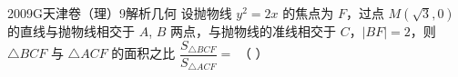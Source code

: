 
\begin{problem}{2009}{G}{天津卷（理）}{9}{解析几何}
设抛物线 $y^2=2x$ 的焦点为 $F$，过点 $M(\sqrt{3},0)$ 的直线与抛物线相交于 $A$, $B$ 两点，与抛物线的准线相交于 $C$，$|BF|=2$，则 $\triangle BCF$ 与 $\triangle ACF$ 的面积之比 $\dfrac{S_{\triangle BCF}}{S_{\triangle ACF}}=$ \hspace{1cm} （ ）
\begin{choices}
\end{choices}
\end{problem}

\begin{answer}

\end{answer}

\begin{solutions}

\end{solutions}